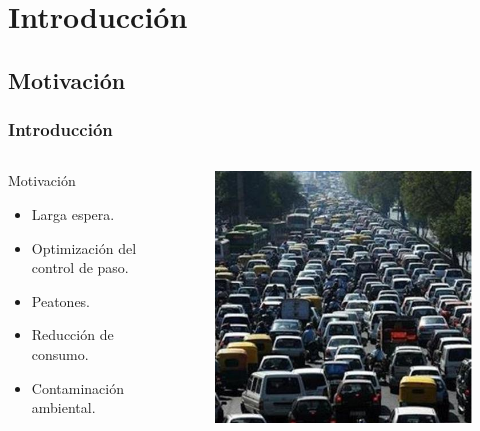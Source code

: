 \section{Introducción} 

\subsection{Motivación}

\begin{frame}
	\frametitle{Introducción}
		\begin{columns}[T]
            \begin{column}{.60\textwidth}
                      \begin{block}{Motivación}
                        \begin{itemize}
                                 \item Larga espera.
                                 \item Optimización del control de paso.
                                 \item Peatones.
                                 \item Reducción de consumo.
                                 \item Contaminación ambiental.
                         \end{itemize}
                \end{block}
              \end{column}
              \hfill
            \begin{column}{.40\textwidth}

                     \begin{figure}[htbp]
                                \centering
                                \includegraphics[width=1\textwidth]{diagramas/motivacion.png}
                        \end{figure}


\end{column}
\end{columns}
\end{frame}
